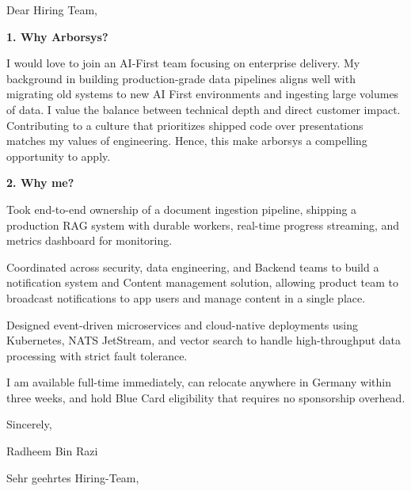 \documentclass[11pt,a4paper]{coverletter}
\begin{document}

\opening{Dear Hiring Team,}

\vspace{8pt}\noindent\textbf{1. Why Arborsys?}\par\vspace{3pt}

I would love to join an AI-First team focusing on enterprise delivery. My background in building production-grade data pipelines aligns well with migrating old systems to new AI First environments and ingesting large volumes of data. I value the balance between technical depth and direct customer impact. Contributing to a culture that prioritizes shipped code over presentations matches my values of engineering. Hence, this make arborsys a compelling opportunity to apply.

\vspace{8pt}\noindent\textbf{2. Why me?}\par\vspace{3pt}

\bullets

  \item Took end-to-end ownership of a document ingestion pipeline, shipping a production RAG system with durable workers, real-time progress streaming, and metrics dashboard for monitoring.

  \item Coordinated across security, data engineering, and Backend teams to build a notification system and Content management solution, allowing product team to broadcast notifications to app users and manage content in a single place.

  \item Designed event-driven microservices and cloud-native deployments using Kubernetes, NATS JetStream, and vector search to handle high-throughput data processing with strict fault tolerance.

\bulletsend

I am available full-time immediately, can relocate anywhere in Germany within three weeks, and hold Blue Card eligibility that requires no sponsorship overhead.

\closing{Sincerely,}{Radheem Bin Razi}

\clearpage
{}


\opening{Sehr geehrtes Hiring-Team,}
\end{document}
